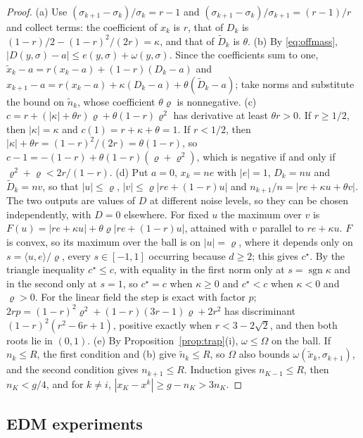 \documentclass{article} %
\theoremstyle{plain}
\theoremstyle{definition}
\theoremstyle{remark}
\begin{document}
\begin{proof}
(a) Use $(\sigma_{k+1}-\sigma_k)/\sigma_k=r-1$ and $(\sigma_{k+1}-\sigma_k)/\sigma_{k+1}=(r-1)/r$ and
collect terms: the coefficient of $x_k$ is $r$, that of $D_k$ is
$(1-r)/2-(1-r)^2/(2r)=\kappa$, and that of $\tilde D_k$ is $\theta$.
(b) By \eqref{eq:offmass}, $|D(y,\sigma)-a|\le e(y,\sigma)+\omega(y,\sigma)$. Since the coefficients sum
to one, $\tilde x_k-a=r(x_k-a)+(1-r)(D_k-a)$ and
$x_{k+1}-a=r(x_k-a)+\kappa(D_k-a)+\theta(\tilde D_k-a)$; take norms and substitute the bound on
$\tilde n_k$, whose coefficient $\theta\varrho$ is nonnegative.
(c) $c=r+(|\kappa|+\theta r)\varrho+\theta(1-r)\varrho^2$ has derivative at least $\theta r>0$. If
$r\ge1/2$, then $|\kappa|=\kappa$ and $c(1)=r+\kappa+\theta=1$. If $r<1/2$, then
$|\kappa|+\theta r=(1-r)^2/(2r)=\theta(1-r)$, so $c-1=-(1-r)+\theta(1-r)(\varrho+\varrho^2)$, which is
negative if and only if $\varrho^2+\varrho<2r/(1-r)$.
(d) Put $a=0$, $x_k=ne$ with $|e|=1$, $D_k=nu$ and $\tilde D_k=nv$, so that $|u|\le\varrho$,
$|v|\le\varrho|re+(1-r)u|$ and $n_{k+1}/n=|re+\kappa u+\theta v|$. The two outputs are values of $D$
at different noise levels, so they can be chosen independently, with $D=0$ elsewhere. For fixed
$u$ the maximum over $v$ is $F(u)=|re+\kappa u|+\theta\varrho|re+(1-r)u|$, attained with $v$
parallel to $re+\kappa u$. $F$ is convex, so its maximum over the ball is on $|u|=\varrho$, where it
depends only on $s=\langle u,e\rangle/\varrho$, every $s\in[-1,1]$ occurring because $d\ge2$; this gives
$c^\star$. By the triangle inequality $c^\star\le c$, with equality in the first norm only at
$s=\operatorname{sgn}\kappa$ and in the second only at $s=1$, so $c^\star=c$ when $\kappa\ge0$ and
$c^\star<c$ when $\kappa<0$ and $\varrho>0$. For the linear field the step is exact with factor $p$;
$2rp=(1-r)^2\varrho^2+(1-r)(3r-1)\varrho+2r^2$ has discriminant $(1-r)^2(r^2-6r+1)$, positive
exactly when $r<3-2\sqrt2$, and then both roots lie in $(0,1)$.
(e) By Proposition~\ref{prop:trap}(i), $\omega\le\Omega$ on the ball. If $n_k\le R$, the first
condition and (b) give $\tilde n_k\le R$, so $\Omega$ also bounds $\omega(\tilde x_k,\sigma_{k+1})$, and the
second condition gives $n_{k+1}\le R$. Induction gives $n_{K-1}\le R$, then $n_K<g/4$, and for
$k\ne i$, $|x_K-x^k|\ge g-n_K>3n_K$.
\end{proof}

\subsection{EDM experiments}
\label{app:relerr-exp}
\end{document}
